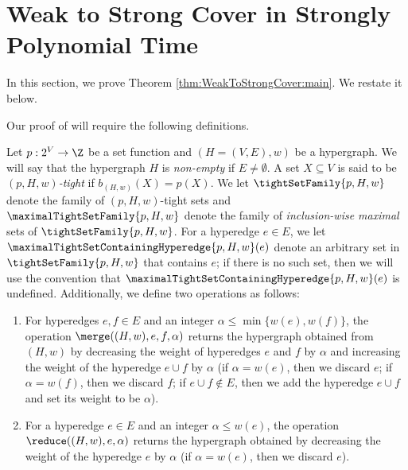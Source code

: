 \section{Weak to Strong Cover in Strongly Polynomial Time}\label{sec:WeakToStrongCover}
In this section, we 
prove Theorem \ref{thm:WeakToStrongCover:main}. We restate it below. 
\thmWeakToStrongCover*

Our proof of  will require the following definitions. 
\begin{definition}\label{def:(pHw)-tight-sets}
    Let $p:2^V\rightarrow\Z$ be a set function and $(H=(V,E), w)$ be a hypergraph. We will say that the hypergraph $H$ is \emph{non-empty} if $E\neq \emptyset$. 
    A set $X \subseteq V$ is said to be \emph{$(p, H, w)$-tight} if $b_{(H,w)}(X)=p(X)$. We let $\tightSetFamily{p,H,w}$ denote the family of $(p, H, w)$-tight sets and $\maximalTightSetFamily{p, H, w}$  denote the family of \emph{inclusion-wise maximal} sets of $\tightSetFamily{p,H,w}$. 
    For a hyperedge $e\in E$, we let $\maximalTightSetContainingHyperedge{p, H, w}(e)$ denote an arbitrary set in $\tightSetFamily{p, H, w}$ that contains $e$; if there is no such set, then we will use the convention that $\maximalTightSetContainingHyperedge{p, H, w}(e)$ is undefined.  
    Additionally, we define two operations as follows:
    \begin{enumerate}
        \item For hyperedges $e, f\in E$ and an integer  $\alpha\le \min\{w(e), w(f)\}$, the operation $\merge((H, w), e, f, \alpha)$ returns the hypergraph obtained from $(H, w)$ by decreasing the weight of hyperedges $e$ and $f$ by $\alpha$ and increasing the weight of the hyperedge $e\cup f$ by $\alpha$ (if $\alpha=w(e)$, then we discard $e$; if $\alpha=w(f)$, then we discard $f$; if $e\cup f\not\in E$, then we add the hyperedge $e\cup f$ and set its weight to be $\alpha$). 
        \item For a hyperedge $e\in E$ and an integer $\alpha \le w(e)$, the operation $\reduce((H, w), e, \alpha)$ returns the hypergraph obtained by decreasing the weight of the hyperedge $e$ by $\alpha$ (if $\alpha=w(e)$, then we discard $e$). 
    \end{enumerate}
\end{definition}


